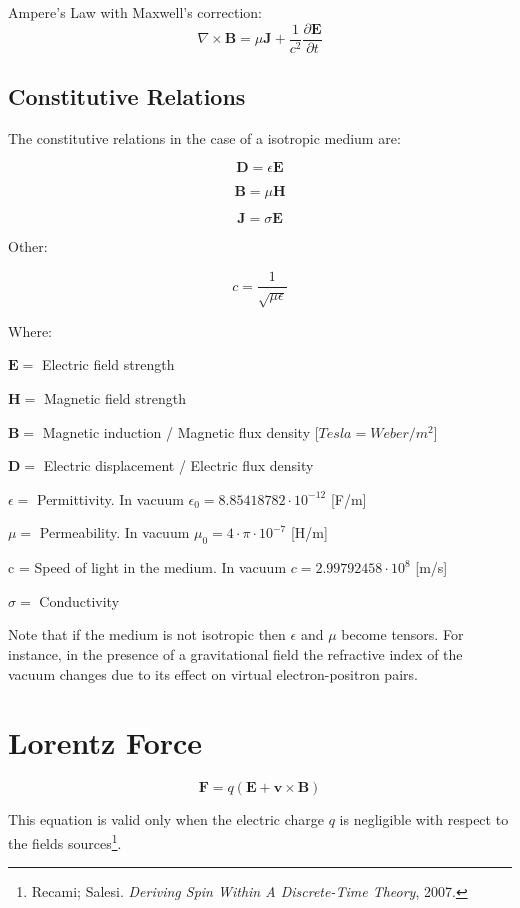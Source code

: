 \documentclass[english, 12pt]{book}
\begin{document}
Ampere's Law with Maxwell's correction:
\begin{equation}
\nabla\times\mathbf{B}=\mu\mathbf{J}+\frac{1}{c^{2}}\frac{\partial\mathbf{E}}{\partial t}        \label{eq:lawAmpere}
\end{equation}


\subsection{Constitutive Relations}

The constitutive relations in the case of a isotropic medium are:

\[ \mathbf{D} = \epsilon \mathbf{E} \]

\[ \mathbf{B} = \mu \mathbf{H} \]

\[ \mathbf{J} = \sigma \mathbf{E} \]

Other:

\[ c = \frac{1}{\sqrt{\mu \epsilon}}\]

Where:

$\mathbf{E} =$ Electric field strength

$\mathbf{H} =$ Magnetic field strength

$\mathbf{B} =$ Magnetic induction / Magnetic flux density [$Tesla = Weber / m^2$]

$\mathbf{D} =$ Electric displacement / Electric flux density

$\epsilon =$ Permittivity. In vacuum $\epsilon_0 = 8.85418782 \cdot 10^{-12}$ [F/m]

$\mu =$ Permeability. In vacuum $\mu_0 = 4 \cdot \pi \cdot 10^{-7}$ [H/m]

c = Speed of light in the medium. In vacuum $c = 2.99792458 \cdot 10^8$ [m/s]

$\sigma =$ Conductivity

Note that if the medium is not isotropic then $\epsilon$ and $\mu$ become tensors. For instance, in the presence of a gravitational field the refractive index of the vacuum changes due to its effect on virtual electron-positron pairs.


\section{Lorentz Force}

\[
\mathbf{F}=q\left(\mathbf{E}+\mathbf{v}\times\mathbf{B}\right)
\]

This equation is valid only when the electric charge $q$ is negligible with respect to the fields sources\footnote{Recami; Salesi. \emph{Deriving Spin Within A Discrete-Time Theory}, 2007.}.
\end{document}
